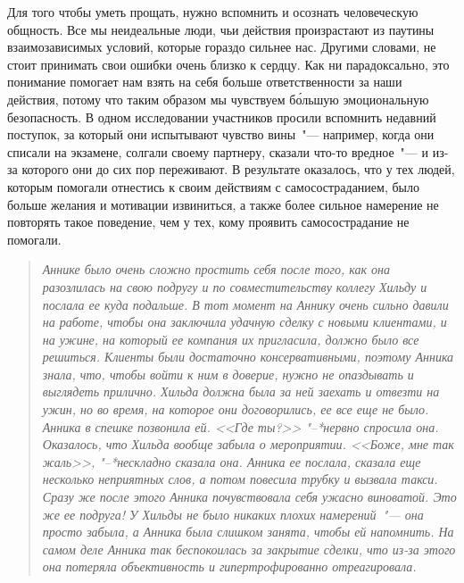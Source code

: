 Для того чтобы уметь прощать, нужно вспомнить и осознать человеческую общность. Все мы неидеальные люди, чьи действия произрастают из паутины взаимозависимых условий, которые гораздо сильнее нас. Другими словами, не стоит принимать свои ошибки очень близко к сердцу. Как ни парадоксально, это понимание помогает нам взять на себя больше ответственности за наши действия, потому что таким образом мы чувствуем б\'{о}льшую эмоциональную безопасность. В одном исследовании участников просили вспомнить недавний поступок, за который они испытывают чувство вины~"--- например, когда они списали на экзамене, солгали своему партнеру, сказали что-то вредное~"--- и из-за которого они до сих пор переживают. В результате оказалось, что у тех людей, которым помогали отнестись к своим действиям с самосостраданием, было больше желания и мотивации извиниться, а также более сильное намерение не повторять такое поведение, чем у тех, кому проявить самосострадание не помогали\cite{113}.  

\begin{quotation}
	\textit{
		Аннике было очень сложно простить себя после того, как она разозлилась на свою подругу и по совместительству коллегу Хильду и послала ее куда подальше. В тот момент на Аннику очень сильно давили на работе, чтобы она заключила удачную сделку с новыми клиентами, и на ужине, на который ее компания их пригласила, должно было все решиться. Клиенты были достаточно консервативными, поэтому Анника знала, что, чтобы войти к ним в доверие, нужно не опаздывать и выглядеть прилично. Хильда должна была за ней заехать и отвезти на ужин, но во время, на которое они договорились, ее все еще не было. Анника в спешке позвонила ей. <<Где ты?>> "--*нервно спросила она. Оказалось, что Хильда вообще забыла о мероприятии. <<Боже, мне так жаль>>, "--*нескладно сказала она. Анника ее послала, сказала еще несколько неприятных слов, а потом повесила трубку и вызвала такси. Сразу же после этого Анника почувствовала себя ужасно виноватой. Это же ее подруга! У Хильды не было никаких плохих намерений~"--- она просто забыла, а Анника была слишком занята, чтобы ей напомнить. На самом деле Анника так беспокоилась за закрытие сделки, что из-за этого она потеряла объективность и гипертрофированно отреагировала.
	}
\end{quotation}

\vspace{3ex}


